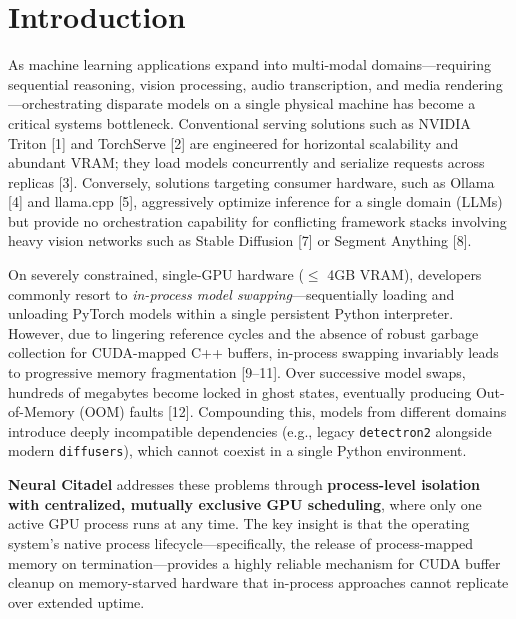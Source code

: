 \documentclass[conference]{IEEEtran}
\begin{document}
\section{Introduction}
As machine learning applications expand into multi-modal domains---requiring sequential reasoning, vision processing, audio transcription, and media rendering---orchestrating disparate models on a single physical machine has become a critical systems bottleneck. Conventional serving solutions such as NVIDIA Triton [1] and TorchServe [2] are engineered for horizontal scalability and abundant VRAM; they load models concurrently and serialize requests across replicas [3]. Conversely, solutions targeting consumer hardware, such as Ollama [4] and llama.cpp [5], aggressively optimize inference for a single domain (LLMs) but provide no orchestration capability for conflicting framework stacks involving heavy vision networks such as Stable Diffusion [7] or Segment Anything [8].

On severely constrained, single-GPU hardware ($\leq$ 4GB VRAM), developers commonly resort to \textit{in-process model swapping}---sequentially loading and unloading PyTorch models within a single persistent Python interpreter. However, due to lingering reference cycles and the absence of robust garbage collection for CUDA-mapped C++ buffers, in-process swapping invariably leads to progressive memory fragmentation [9--11]. Over successive model swaps, hundreds of megabytes become locked in ghost states, eventually producing Out-of-Memory (OOM) faults [12]. Compounding this, models from different domains introduce deeply incompatible dependencies (e.g., legacy \texttt{detectron2} alongside modern \texttt{diffusers}), which cannot coexist in a single Python environment.

\textbf{Neural Citadel} addresses these problems through \textbf{process-level isolation with centralized, mutually exclusive GPU scheduling}, where only one active GPU process runs at any time. The key insight is that the operating system's native process lifecycle---specifically, the release of process-mapped memory on termination---provides a highly reliable mechanism for CUDA buffer cleanup on memory-starved hardware that in-process approaches cannot replicate over extended uptime.
\end{document}
